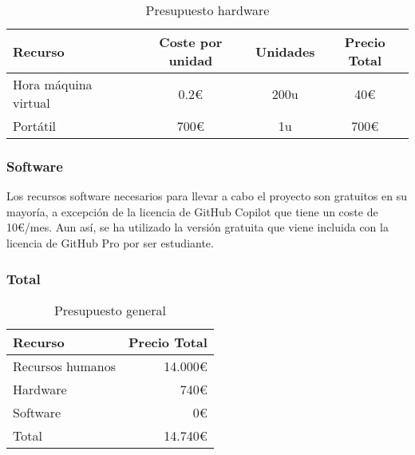 \begin{table}[ht]
    \centering
    \begin{tabular}[ht]{l|c|c|c}
        \textbf{Recurso}     & \textbf{Coste por unidad} & \textbf{Unidades} & \textbf{Precio Total} \\
        \hline
        Hora máquina virtual & 0.2\euro                  & 200u              & 40\euro               \\
        Portátil             & 700\euro                  & 1u                & 700\euro              \\
    \end{tabular}
    \caption{Presupuesto hardware}
    \label{tab:hardware-budget}
\end{table}

\subsubsection{Software}
Los recursos software necesarios para llevar a cabo el proyecto son gratuitos
en su mayoría, a excepción de la licencia de GitHub Copilot que tiene un coste
de 10\euro/mes. Aun así, se ha utilizado la versión gratuita que viene incluida
con la licencia de GitHub Pro por ser estudiante.

\subsubsection{Total}
\begin{table}
    \centering
    \begin{tabular}[ht]{l|r}
        \textbf{Recurso} & \textbf{Precio Total} \\
        \hline
        Recursos humanos & 14.000\euro           \\
        Hardware         & 740\euro              \\
        Software         & 0\euro                \\
        \hline
        Total            & 14.740\euro           \\
    \end{tabular}
    \caption{Presupuesto general}
    \label{tab:total-budget}
\end{table}

\pagebreak